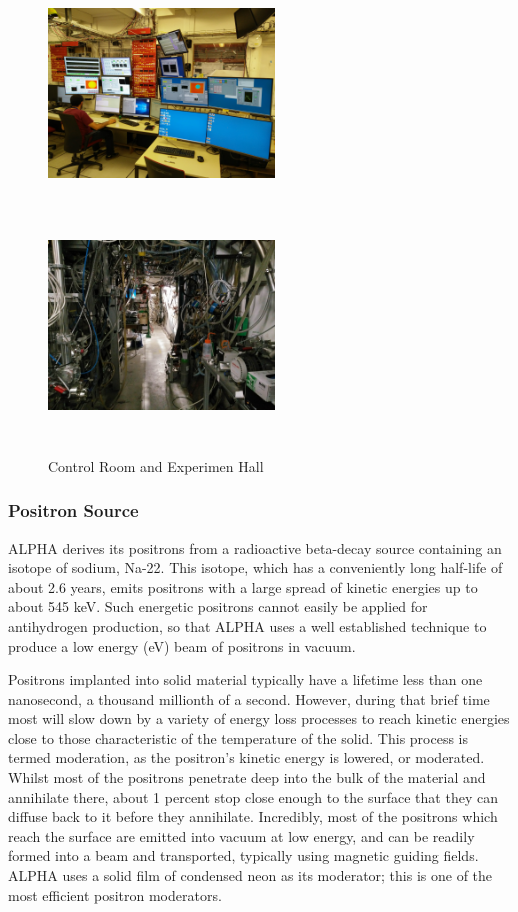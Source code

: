\documentclass{article}
\begin{document}
\begin{figure}[h]
\centering
\includegraphics[width=60mm, height=60mm]{control_room}
\includegraphics[width=60mm, height=60mm]{experiment_hall}
\caption{Control Room and Experimen Hall}
\label{control}
\end{figure}




\subsubsection{Positron Source}

ALPHA derives its positrons from a radioactive beta-decay source containing an isotope of sodium, Na-22. This isotope, which has a conveniently long half-life of about 2.6 years, emits positrons with a large spread of kinetic energies up to about 545 keV. Such energetic positrons cannot easily be applied for antihydrogen production, so that ALPHA uses a well established technique to produce a low energy (eV) beam of positrons in vacuum.

Positrons implanted into solid material typically have a lifetime less than one nanosecond, a thousand millionth of a second. However, during that brief time most will slow down by a variety of energy loss processes to reach kinetic energies close to those characteristic of the temperature of the solid. This process is termed moderation, as the positron’s kinetic energy is lowered, or moderated. Whilst most of the positrons penetrate deep into the bulk of the material and annihilate there, about 1 percent
 stop close enough to the surface that they can diffuse back to it before they annihilate. Incredibly, most of the positrons which reach the surface are emitted into vacuum at low energy, and can be readily formed into a beam and transported, typically using magnetic guiding fields. ALPHA uses a solid film of condensed neon as its moderator; this is one of the most efficient positron moderators.
 
\end{document}
